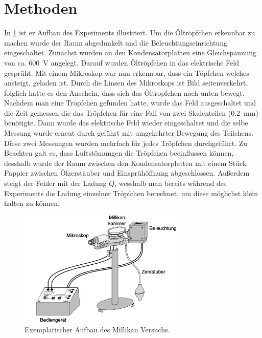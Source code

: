 \documentclass[
	a4paper,
	12pt,
	pagesize,
	ngerman
]{scrartcl}
\begin{document}
	\section{Methoden}
	In \cref{Millikan} ist er Aufbau des Experiments illustriert.
	Um die Öltröpfchen erkennbar zu machen wurde der Raum abgedunkelt und die Beleuchtungseinrichtung eingeschaltet.
	Zunächst wurden an den Kondensatorplatten eine Gleichspannung von ca. \SI{600}{V} angelegt. 
	Darauf wurden Öltröpfchen in das elektrische Feld gesprüht.
	Mit einem Mikroskop war nun erkennbar, dass ein Töpfchen welches ansteigt, geladen ist. 
	Durch die Linsen des Mikroskops ist Bild seitenverkehrt, folglich hatte es den Anschein, dass sich das Öltropfchen nach unten bewegt. 
	Nachdem man eine Tröpfchen gefunden hatte, wurde das Feld ausgeschaltet und die Zeit gemessen die das Tröpfchen für eine Fall von zwei Skalenteilen (\SI{0,2}{mm}) benötigte. 
	Dann wurde das elektrische Feld wieder eingeschaltet und die selbe Messung wurde erneut durch geführt mit umgekehrter Bewegung des Teilchens.
	Diese zwei Messungen wurden mehrfach für jedes Tröpfchen durchgeführt. 
	Zu Beachten galt es, dass Luftstömungen die Tröpfchen beeinflussen können, desshalb wurde der Raum zwischen den Kondensatorplatten mit einem Stück Pappier zwischen Ölzerstäuber und Einsprühöffnung abgeschlossen.
	Außerdem steigt der Fehler mit der Ladung $Q$, wesshalb man bereits während des Experiments die Ladung einzelner Tröpfchen berechnet, um diese möglichst klein halten zu können.


	\begin{figure}[H]
		\includegraphics[width=0.7\textwidth]{Millikan}
		\centering
		\caption{Exemplarischer Aufbau des Millikan Versuchs. \protect\footnotemark}
		\label{Millikan}
		\centering
	\end{figure} 
\end{document}

